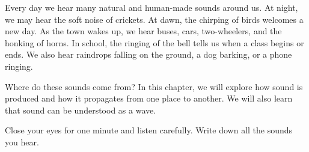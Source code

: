 Every day we hear many natural and human-made sounds around us. At night, we may hear the soft noise of crickets. At dawn, the chirping of birds welcomes a new day. As the town wakes up, we hear buses, cars, two-wheelers, and the honking of horns. In school, the ringing of the bell tells us when a class begins or ends. We also hear raindrops falling on the ground, a dog barking, or a phone ringing.

Where do these sounds come from? In this chapter, we will explore how sound is produced and how it propagates from one place to another. We will also learn that sound can be understood as a wave.

 Close your eyes for one minute and listen carefully. Write down all the sounds you hear.